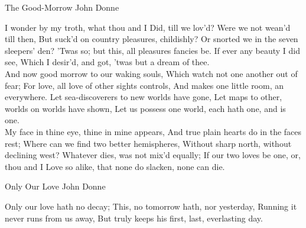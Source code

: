 \begin{poem}
{The Good-Morrow}
{John Donne}

I wonder by my troth, what thou and I 
Did, till we lov'd? Were we not wean'd till then, 
But suck'd on country pleasures, childishly? 
Or snorted we in the seven sleepers' den? 
'Twas so; but this, all pleasures fancies be. 
If ever any beauty I did see, 
Which I desir'd, and got, 'twas but a dream of thee.\\

And now good morrow to our waking souls, 
Which watch not one another out of fear; 
For love, all love of other sights controls, 
And makes one little room, an everywhere. 
Let sea-discoverers to new worlds have gone, 
Let maps to other, worlds on worlds have shown, 
Let us possess one world, each hath one, and is one.\\

My face in thine eye, thine in mine appears, 
And true plain hearts do in the faces rest; 
Where can we find two better hemispheres, 
Without sharp north, without declining west? 
Whatever dies, was not mix'd equally; 
If our two loves be one, or, thou and I 
Love so alike, that none do slacken, none can die.\\
\end{poem}

\begin{poem}
{Only Our Love}
{John Donne}

Only our love hath no decay; 
This, no tomorrow hath, nor yesterday, 
Running it never runs from us away, 
But truly keeps his first, last, everlasting day.
\end{poem}

